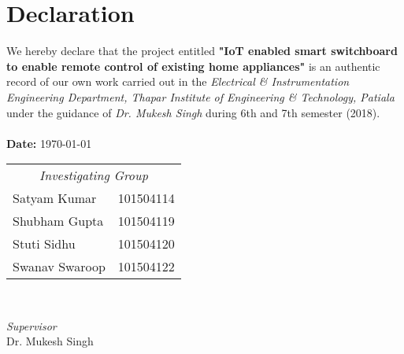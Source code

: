 \chapter*{Declaration}
    
    We hereby declare that the project entitled \textbf{"IoT enabled smart switchboard to enable remote control of existing home appliances"} is an authentic record of our own work carried out in the \textit{Electrical \& Instrumentation Engineering Department, Thapar Institute of Engineering \& Technology, Patiala} under the guidance of \textit{Dr. Mukesh Singh} during 6th and 7th semester (2018).\\\\
    \hspace*{\fill} \textbf{Date: }\today \\
	\vfill
	\vfill
	\begin{minipage}{0.5\textwidth}
		\begin{flushleft}
			\large
				\begin{tabular}{l l}
					\multicolumn{2}{c}{\textit{Investigating Group}} \\
					Satyam Kumar   & 101504114 \\
					Shubham Gupta  & 101504119 \\
					Stuti Sidhu    & 101504120 \\
					Swanav Swaroop & 101504122 \\
				\end{tabular}
			
		\end{flushleft}
	\end{minipage}
	~
	\begin{minipage}{0.4\textwidth}
		\begin{flushright}
			\large
			\textit{Supervisor}\\
			Dr. Mukesh Singh
		\end{flushright}
	\end{minipage}
    \vfill
    
    